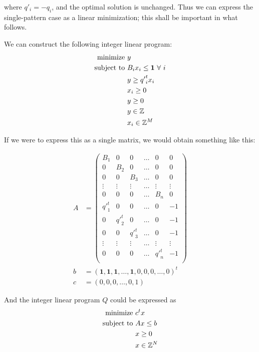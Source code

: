 where $q'_i = -q_i$, and the optimal solution is unchanged. Thus we can express the single-pattern case as a linear minimization; this shall be important in what follows.

We can construct the following integer linear program:
\begin{alignat*}{2}
  \text{minimize } & y\\
  \text{subject to } & B_i x_i \le \mathbf{1}\ \forall\ i\\
                     & y \ge {q'}_i^t x_i\\
                     & x_i \ge 0\\
                     & y \ge 0\\
                     & y \in \mathbb{Z}\\
                     & x_i \in \mathbb{Z}^M
\end{alignat*}

If we were to express this as a single matrix, we would obtain something like this:

\begin{align*}
A &= \begin{pmatrix}
B_1 & 0   & 0   & \dots & 0 & 0\\
0   & B_2 & 0   & \dots & 0 & 0\\
0   & 0   & B_3 & \dots & 0 & 0\\
\vdots & \vdots & \vdots & \dots & \vdots & \vdots\\
0 & 0 & 0 & \dots & B_n & 0\\
{q'}_1^t & 0 & 0 & \dots & 0 & -1\\
0 & {q'}_2^t & 0 & \dots & 0 & -1\\
0 & 0 & {q'}_3^t & \dots & 0 & -1\\
\vdots & \vdots & \vdots & \dots & \vdots & \vdots\\
0 & 0 & 0 & \dots & {q'}_n^t & -1\\
\end{pmatrix}\\
b &= (\mathbf{1}, \mathbf{1}, \mathbf{1}, \dots, \mathbf{1}, 0, 0, 0, \dots, 0)^t\\
c &= (0, 0, 0, \dots, 0, 1)
\end{align*}

And the integer linear program $Q$ could be expressed as
\begin{alignat}{2}
  \text{minimize } & c^t x\\
  \text{subject to } & Ax \le b\\
                     & x \ge 0\\
                     & x \in \mathbb{Z}^N
\end{alignat}

